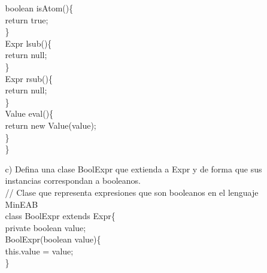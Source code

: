 \documentclass{article}
\begin{document}
\begin{itemize}
\begin{itemize}
            \hspace*{0.6cm}boolean isAtom()\{\\
            \hspace*{1.37cm}return true;\\
            \hspace*{0.6cm}\}\\
            
            \hspace*{0.6cm}Expr lsub()\{\\
            \hspace*{1.37cm}return null;\\
            \hspace*{0.6cm}\}\\
            
            \hspace*{0.6cm}Expr rsub()\{\\
            \hspace*{1.37cm}return null;\\
            \hspace*{0.6cm}\}\\
            
            \hspace*{0.6cm}Value eval()\{\\
            \hspace*{1.37cm}return new Value(value);\\
            \hspace*{0.6cm}\}\\
            \}\\
            
            \item[c)] Defina una clase BoolExpr que extienda a Expr y de forma que sus instancias correspondan a booleanos.\\

            // Clase que representa expresiones que son booleanos en el lenguaje MinEAB\\
            class BoolExpr extends Expr\{\\
            \hspace*{0.6cm}private boolean value;\\
            
            \hspace*{0.6cm}BoolExpr(boolean value)\{\\
            \hspace*{1.37cm}this.value = value;\\
            \hspace*{0.65cm}\}\\
            

\end{itemize}
\end{itemize}
\end{document}
